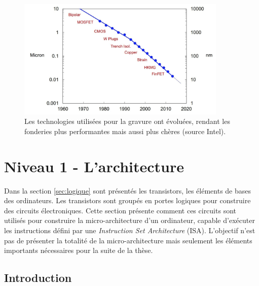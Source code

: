 \begin{figure}
    \center
    \includegraphics[width=10cm]{images/processeurs_porte_fondeurs.png}
    \caption{\label{processeurs_porte_fondeurs} Les technologies utilisées pour la gravure ont évoluées, rendant les fonderies plus performantes mais aussi plus chères (source Intel).}
\end{figure}












\section{Niveau 1 - L'architecture} \label{sec:micro}

Dans la section \autoref{sec:logique} sont présentés les transistors, les éléments de bases des ordinateurs. Les transistors sont groupés en portes logiques pour construire des circuits électroniques. Cette section présente comment ces circuits sont utilisés pour construire la micro-architecture d’un ordinateur, capable d’exécuter les instructions défini par une \textit{Instruction Set Architecture} (ISA). L’objectif n’est pas de présenter la totalité de la micro-architecture mais seulement les éléments importants nécessaires pour la suite de la thèse.



\subsection{Introduction}



